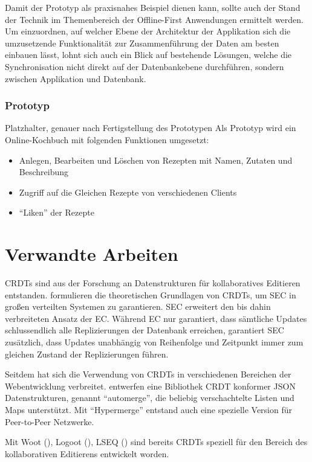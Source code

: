\documentclass[a4paper, 12pt]{scrreprt}
\newcommand\klammercite[1]{%
	(\citealt{#1})}
\begin{document}
Damit der Prototyp als praxisnahes Beispiel dienen kann, sollte auch der Stand der Technik im Themenbereich der Offline-First Anwendungen ermittelt werden. Um einzuordnen, auf welcher Ebene der Architektur der Applikation sich die umzusetzende Funktionalität zur Zusammenführung der Daten am besten einbauen lässt, lohnt sich auch ein Blick auf bestehende Lösungen, welche die Synchronisation nicht direkt auf der Datenbankebene durchführen, sondern zwischen Applikation und Datenbank.

\subsection{Prototyp}
Platzhalter, genauer nach Fertigstellung des Prototypen
Als Prototyp wird ein Online-Kochbuch mit folgenden Funktionen umgesetzt:
\begin{itemize}
	\item Anlegen, Bearbeiten und Löschen von Rezepten mit Namen, Zutaten und Beschreibung
	\item Zugriff auf die Gleichen Rezepte von verschiedenen Clients
	\item \enquote{Liken} der Rezepte
\end{itemize}

\chapter{Verwandte Arbeiten}
\label{sec:VerwandteArbeiten}
CRDTs sind aus der Forschung an Datenstrukturen für kollaboratives Editieren entstanden. \citet{InproceedingsCRDTOriginal} formulieren die theoretischen Grundlagen von CRDTs, um \ac{SEC} in großen verteilten Systemen zu garantieren. \ac{SEC} erweitert den bis dahin verbreiteten Ansatz der \ac{EC}. Während EC nur garantiert, dass sämtliche Updates schlussendlich alle Replizierungen der Datenbank erreichen, garantiert SEC zusätzlich, dass Updates unabhängig von Reihenfolge und Zeitpunkt immer zum gleichen Zustand der Replizierungen führen.

Seitdem hat sich die Verwendung von CRDTs in verschiedenen Bereichen der Webentwicklung verbreitet. \citet{ArticleCRDTJSON} entwerfen eine Bibliothek CRDT konformer \ac{JSON} Datenstrukturen, genannt \enquote{automerge}, die beliebig verschachtelte Listen und Maps unterstützt. Mit \enquote{Hypermerge} entstand auch eine spezielle Version für Peer-to-Peer Netzwerke.

Mit Woot \klammercite{InproceedingsCRDTWoot}, Logoot \klammercite{InproceedingsCRDTLogoot}, LSEQ \klammercite{InproceedingsCRDTLSEQ} sind bereits CRDTs speziell für den Bereich des kollaborativen Editierens entwickelt worden. 
\end{document}
